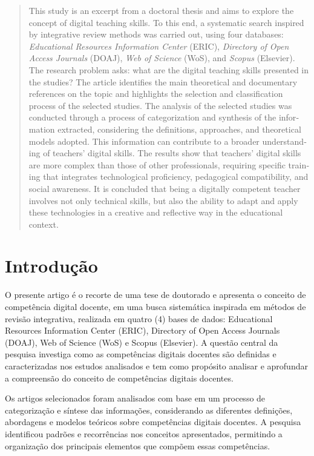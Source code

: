 \documentclass[portuguese]{textolivre}
\begin{document}
\begin{polyabstract}
\begin{english}
\begin{abstract}
This study is an excerpt from a doctoral
thesis and aims to explore the concept of digital teaching skills. To
this end, a systematic search inspired by integrative review methods was
carried out, using four databases: \emph{Educational Resources
Information Center} (ERIC), \emph{Directory of Open Access Journals}
(DOAJ), \emph{Web of Science} (WoS), and \emph{Scopus }(Elsevier). The
research problem asks: what are the digital teaching skills presented in
the studies? The article identifies the main theoretical and documentary
references on the topic and highlights the selection and classification
process of the selected studies. The analysis of the selected studies
was conducted through a process of categorization and synthesis of the
information extracted, considering the definitions, approaches, and
theoretical models adopted. This information can contribute to a broader
understanding of teachers' digital skills. The results show that
teachers' digital skills are more complex than those of other
professionals, requiring specific training that integrates technological
proficiency, pedagogical compatibility, and social awareness. It is
concluded that being a digitally competent teacher involves not only
technical skills, but also the ability to adapt and apply these
technologies in a creative and reflective way in the educational
context.

\end{abstract}
\end{english}
\end{polyabstract}

\section{Introdução}
O presente artigo é o recorte de uma tese de doutorado e apresenta o
conceito de competência digital docente, em uma busca sistemática
inspirada em métodos de revisão integrativa, realizada em quatro (4)
bases de dados: Educational Resources Information Center (ERIC),
Directory of Open Access Journals (DOAJ), Web of Science (WoS) e Scopus
(Elsevier). A questão central da pesquisa investiga como as competências
digitais docentes são definidas e caracterizadas nos estudos analisados
e tem como propósito analisar e aprofundar a compreensão do conceito de
competências digitais docentes.

Os artigos selecionados foram analisados com base em um processo de
categorização e síntese das informações, considerando as diferentes
definições, abordagens e modelos teóricos sobre competências digitais
docentes. A pesquisa identificou padrões e recorrências nos conceitos
apresentados, permitindo a organização dos principais elementos que
compõem essas competências.
\end{document}
